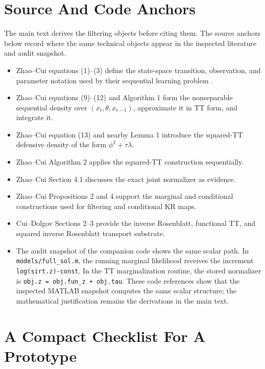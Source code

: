 \documentclass[11pt]{article}
\theoremstyle{definition}
\theoremstyle{remark}
\begin{document}
\appendix
\section{Source And Code Anchors}

The main text derives the filtering objects before citing them.  The source
anchors below record where the same technical objects appear in the inspected
literature and audit snapshot.

\begin{itemize}[leftmargin=*]
\item Zhao--Cui equations (1)--(3) define the state-space transition,
  observation, and parameter notation used by their sequential learning
  problem \cite{zhao-cui-2024}.
\item Zhao--Cui equations (9)--(12) and Algorithm 1 form the nonseparable
  sequential density over \((x_t,\theta,x_{t-1})\), approximate it in TT form,
  and integrate it.
\item Zhao--Cui equation (13) and nearby Lemma 1 introduce the squared-TT
  defensive density of the form \(\phi^2+\tau\lambda\).
\item Zhao--Cui Algorithm 2 applies the squared-TT construction sequentially.
\item Zhao--Cui Section 4.1 discusses the exact joint normalizer as evidence.
\item Zhao--Cui Propositions 2 and 4 support the marginal and conditional
  constructions used for filtering and conditional KR maps.
\item Cui--Dolgov Sections 2--3 provide the inverse Rosenblatt, functional TT,
  and squared inverse Rosenblatt transport substrate.
\item The audit snapshot of the companion code shows the same scalar path.
  In \texttt{models/full\_sol.m}, the running marginal likelihood receives
  the increment \texttt{log(sirt.z)-const}.  In the TT marginalization routine,
  the stored normalizer is \texttt{obj.z = obj.fun\_z + obj.tau}.  These code
  references show that the inspected MATLAB snapshot computes the same scalar
  structure; the mathematical justification remains the derivations in the
  main text.
\end{itemize}

\section{A Compact Checklist For A Prototype}
\end{document}

